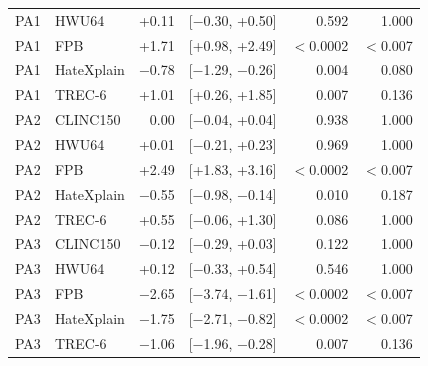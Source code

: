 \begin{tabular}{llrcrr}
PA1 & HWU64 & +0.11 & [$-$0.30, +0.50] & 0.592 & 1.000 \\
\rowcolor{rowhl} PA1 & FPB & +1.71 & [+0.98, +2.49] & $<$0.0002 & $<$0.007 \\
PA1 & HateXplain & $-$0.78 & [$-$1.29, $-$0.26] & 0.004 & 0.080 \\
PA1 & TREC-6 & +1.01 & [+0.26, +1.85] & 0.007 & 0.136 \\
\midrule
PA2 & CLINC150 & 0.00 & [$-$0.04, +0.04] & 0.938 & 1.000 \\
PA2 & HWU64 & +0.01 & [$-$0.21, +0.23] & 0.969 & 1.000 \\
\rowcolor{rowhl} PA2 & FPB & +2.49 & [+1.83, +3.16] & $<$0.0002 & $<$0.007 \\
PA2 & HateXplain & $-$0.55 & [$-$0.98, $-$0.14] & 0.010 & 0.187 \\
PA2 & TREC-6 & +0.55 & [$-$0.06, +1.30] & 0.086 & 1.000 \\
\midrule
PA3 & CLINC150 & $-$0.12 & [$-$0.29, +0.03] & 0.122 & 1.000 \\
PA3 & HWU64 & +0.12 & [$-$0.33, +0.54] & 0.546 & 1.000 \\
\rowcolor{rowhl} PA3 & FPB & $-$2.65 & [$-$3.74, $-$1.61] & $<$0.0002 & $<$0.007 \\
\rowcolor{rowhl} PA3 & HateXplain & $-$1.75 & [$-$2.71, $-$0.82] & $<$0.0002 & $<$0.007 \\
PA3 & TREC-6 & $-$1.06 & [$-$1.96, $-$0.28] & 0.007 & 0.136 \\
\bottomrule
\end{tabular}
